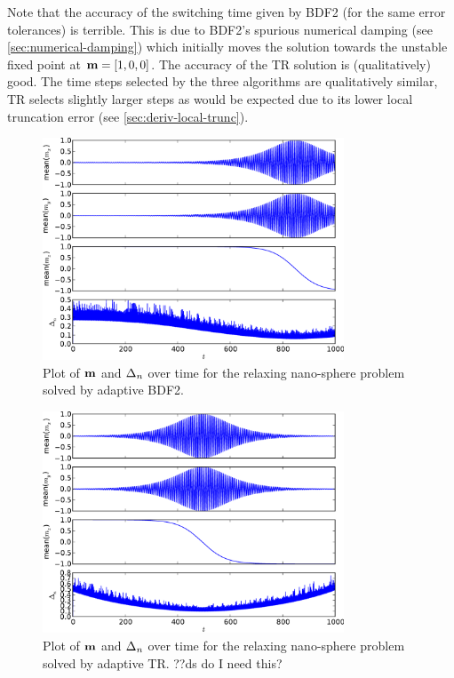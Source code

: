 Note that the accuracy of the switching time given by BDF2 (for the same error tolerances) is terrible.
This is due to BDF2's spurious numerical damping (see \cref{sec:numerical-damping}) which initially moves the solution towards the unstable fixed point at $\boldsymbol{\mathrm{m}}=[1, 0, 0]$.
The accuracy of the TR solution is (qualitatively) good.
The time steps selected by the three algorithms are qualitatively similar, TR selects slightly larger steps as would be expected due to its lower local truncation error (see \cref{sec:deriv-local-trunc}).


\begin{figure}
  \centering
  \includegraphics[width=0.8\textwidth]{plots/aimr-sphere-relax/bdf21-meanmxsvs-meanmysvs-meanmzsvs-dtsvstimes.pdf}
  \caption{Plot of $\boldsymbol{\mathrm{m}}$ and $\Delta_{n}$ over time for the relaxing nano-sphere problem solved by adaptive BDF2.}
  \label{fig:bdf2-llg-ode}
\end{figure}


\begin{figure}
  \centering
  \includegraphics[width=0.8\textwidth]{plots/aimr-sphere-relax/tr1-meanmxsvs-meanmysvs-meanmzsvs-dtsvstimes.pdf}
  \caption{Plot of $\boldsymbol{\mathrm{m}}$ and $\Delta_{n}$ over time for the relaxing nano-sphere problem solved by adaptive TR. ??ds do I need this?}
  \label{fig:tr-llg-ode}
\end{figure}

